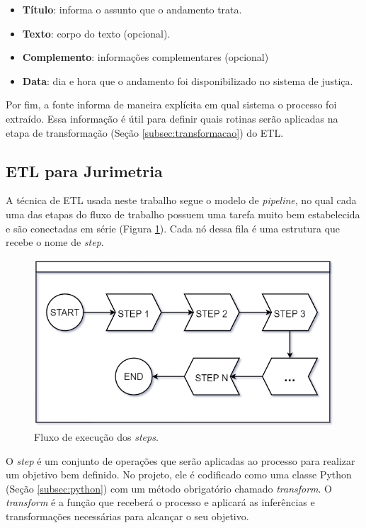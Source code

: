 \begin{itemize}
    \item \textbf{Título}: informa o assunto que o andamento trata.
    \item \textbf{Texto}: corpo do texto (opcional).
    \item \textbf{Complemento}: informações complementares (opcional)
    \item \textbf{Data}: dia e hora que o andamento foi disponibilizado no sistema de justiça.
\end{itemize}

Por fim, a fonte informa de maneira explícita em qual sistema o processo foi extraído. Essa informação é útil para definir quais rotinas serão aplicadas na etapa de transformação (Seção \ref{subsec:transformacao}) do ETL.


\subsection{ETL para Jurimetria}
\label{subsec:jurimetria}

A técnica de ETL usada neste trabalho segue o modelo de \textit{pipeline}, no qual cada uma das etapas do fluxo de trabalho possuem uma tarefa muito bem estabelecida e são conectadas em série (Figura \ref{fig:stepsFlow}). Cada nó dessa fila é uma estrutura que recebe o nome de \textit{step}.

\begin{figure}[ht]
\centering
\includegraphics[width=1\textwidth]{imagens/steps-flow.png}
\caption{Fluxo de execução dos \textit{steps}.}
\label{fig:stepsFlow}
\end{figure}

O \textit{step} é um conjunto de operações que serão aplicadas ao processo para realizar um objetivo bem definido. No projeto, ele é codificado como uma classe Python (Seção \ref{subsec:python}) com um método obrigatório chamado \textit{transform}. O \textit{transform} é a função que receberá o processo e aplicará as inferências e transformações necessárias para alcançar o seu objetivo.

